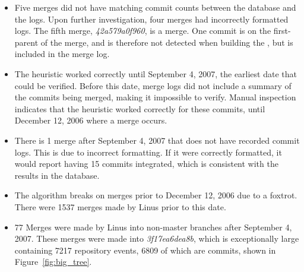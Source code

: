 \begin{itemize}
  \item

    Five merges did not have matching commit counts between the database
    and the logs. Upon further investigation, four merges had
    incorrectly formatted logs. The fifth merge,
    \emph{42a579a0f960}, is a \foxtrot{}
    merge. One commit is on the first-parent of the merge, and is
    therefore not detected when building the \mt{}, but is included
    in the merge log.

  \item

    The heuristic worked correctly until September 4, 2007, the earliest
    date that could be verified. Before this date, merge logs did not
    include a summary of the commits being merged, making it impossible
    to verify. Manual inspection indicates that the heuristic worked
    correctly for these commits, until December 12, 2006 where a
    \foxtrot{} merge occurs.

  \item

    There is 1 merge after September 4, 2007 that does not have recorded
    commit logs. This is due to incorrect formatting. If it were
    correctly formatted, it would report having 15 commits integrated,
    which is consistent with the results in the database.

  \item

    The algorithm breaks on merges prior to December 12, 2006 due to a
    foxtrot. There were 1537 merges made by Linus prior to this date.

  \item

    77 Merges were made by Linus into non-master branches after
    September 4, 2007. These merges were made into
    \emph{3f17ea6dea8b}, which is
    exceptionally large containing 7217 repository events, 6809 of
    which are commits, shown in Figure~\ref{fig:big_tree}.

\end{itemize}

